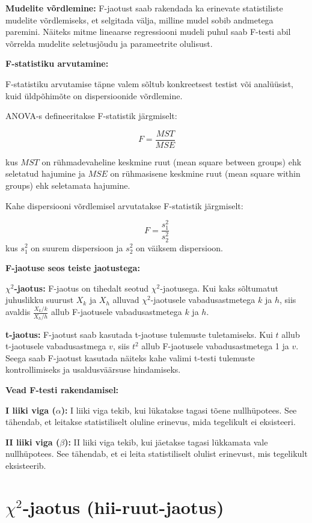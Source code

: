 \documentclass[
]{book}
\begin{document}
\textbf{Mudelite võrdlemine:} F-jaotust saab rakendada ka erinevate statistiliste mudelite võrdlemiseks, et selgitada välja, milline mudel sobib andmetega paremini. Näiteks mitme lineaarse regressiooni mudeli puhul saab F-testi abil võrrelda mudelite seletusjõudu ja parameetrite olulisust.

\textbf{F-statistiku arvutamine:}

F-statistiku arvutamise täpne valem sõltub konkreetsest testist või analüüsist, kuid üldpõhimõte on dispersioonide võrdlemine.

ANOVA-s defineeritakse F-statistik järgmiselt:

\[F = \frac{MST}{MSE}\]

kus \(MST\) on rühmadevaheline keskmine ruut (mean square between groups) ehk seletatud hajumine ja \(MSE\) on rühmasisene keskmine ruut (mean square within groups) ehk seletamata hajumine.

Kahe dispersiooni võrdlemisel arvutatakse F-statistik järgmiselt:

\[F = \frac{s_1^2}{s_2^2}\]
kus \(s_1^2\) on suurem dispersioon ja \(s_2^2\) on väiksem dispersioon.

\textbf{F-jaotuse seos teiste jaotustega:}

\textbf{\(\chi^2\)-jaotus:} F-jaotus on tihedalt seotud \(\chi^2\)-jaotusega. Kui kaks sõltumatut juhuslikku suurust \(X_k\) ja \(X_h\) alluvad \(\chi^2\)-jaotusele vabadusastmetega \(k\) ja \(h\), siis avaldis \(\frac{X_k/k}{X_h/h}\) allub F-jaotusele vabadusastmetega \(k\) ja \(h\).

\textbf{t-jaotus:} F-jaotust saab kasutada t-jaotuse tulemuste tuletamiseks. Kui \(t\) allub t-jaotusele vabadusastmega \(v\), siis \(t^2\) allub F-jaotusele vabadusastmetega 1 ja \(v\). Seega saab F-jaotust kasutada näiteks kahe valimi t-testi tulemuste kontrollimiseks ja usaldusväärsuse hindamiseks.

\textbf{Vead F-testi rakendamisel:}

\textbf{I liiki viga (\(\alpha\)):} I liiki viga tekib, kui lükatakse tagasi tõene nullhüpotees. See tähendab, et leitakse statistiliselt oluline erinevus, mida tegelikult ei eksisteeri.

\textbf{II liiki viga (\(\beta\)):} II liiki viga tekib, kui jäetakse tagasi lükkamata vale nullhüpotees. See tähendab, et ei leita statistiliselt olulist erinevust, mis tegelikult eksisteerib.

\section{\texorpdfstring{\(\chi^2\)-jaotus (hii-ruut-jaotus)}{\textbackslash chi\^{}2-jaotus (hii-ruut-jaotus)}}\label{chi2-jaotus-hii-ruut-jaotus}
\end{document}
